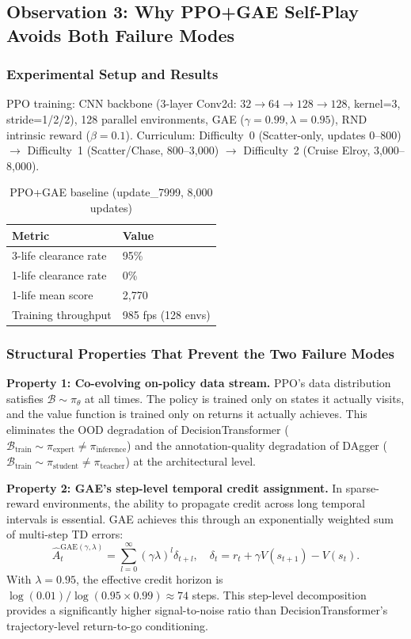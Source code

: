 \documentclass[11pt,a4paper]{article}
\theoremstyle{definition}
\begin{document}
\subsection{Observation 3: Why PPO+GAE Self-Play Avoids Both Failure Modes}

\subsubsection{Experimental Setup and Results}

PPO training: CNN backbone (3-layer Conv2d: $32\to 64\to 128\to 128$, kernel=3, stride=1/2/2), 128 parallel environments, GAE ($\gamma=0.99, \lambda=0.95$), RND intrinsic reward ($\beta=0.1$).
Curriculum: Difficulty~0 (Scatter-only, updates 0--800) $\to$ Difficulty~1 (Scatter/Chase, 800--3,000) $\to$ Difficulty~2 (Cruise Elroy, 3,000--8,000).

\begin{table}[ht]
\centering
\small
\caption{PPO+GAE baseline (update\_7999, 8,000 updates)}
\label{tab:ppo-baseline}
\begin{tabular}{@{}p{5.5cm}p{3cm}@{}}
\toprule
\textbf{Metric} & \textbf{Value} \\
\midrule
3-life clearance rate & 95\% \\
1-life clearance rate & 0\% \\
1-life mean score & 2,770 \\
Training throughput & 985 fps (128 envs) \\
\bottomrule
\end{tabular}
\end{table}

\subsubsection{Structural Properties That Prevent the Two Failure Modes}

\textbf{Property 1: Co-evolving on-policy data stream.}
PPO's data distribution satisfies $\mathcal{B} \sim \pi_\theta$ at all times.
The policy is trained only on states it actually visits, and the value function is trained only on returns it actually achieves.
This eliminates the OOD degradation of DecisionTransformer ($\mathcal{B}_{\text{train}} \sim \pi_{\text{expert}} \neq \pi_{\text{inference}}$) and the annotation-quality degradation of DAgger ($\mathcal{B}_{\text{train}} \sim \pi_{\text{student}} \neq \pi_{\text{teacher}}$) at the architectural level.

\textbf{Property 2: GAE's step-level temporal credit assignment.}
In sparse-reward environments, the ability to propagate credit across long temporal intervals is essential.
GAE achieves this through an exponentially weighted sum of multi-step TD errors:
\begin{equation}
\hat{A}_t^{\text{GAE}(\gamma,\lambda)} = \sum_{l=0}^{\infty} (\gamma\lambda)^l \delta_{t+l}, \quad \delta_t = r_t + \gamma V(s_{t+1}) - V(s_t).
\end{equation}
With $\lambda=0.95$, the effective credit horizon is $\log(0.01)/\log(0.95 \times 0.99) \approx 74$ steps.
This step-level decomposition provides a significantly higher signal-to-noise ratio than DecisionTransformer's trajectory-level return-to-go conditioning.
\end{document}
